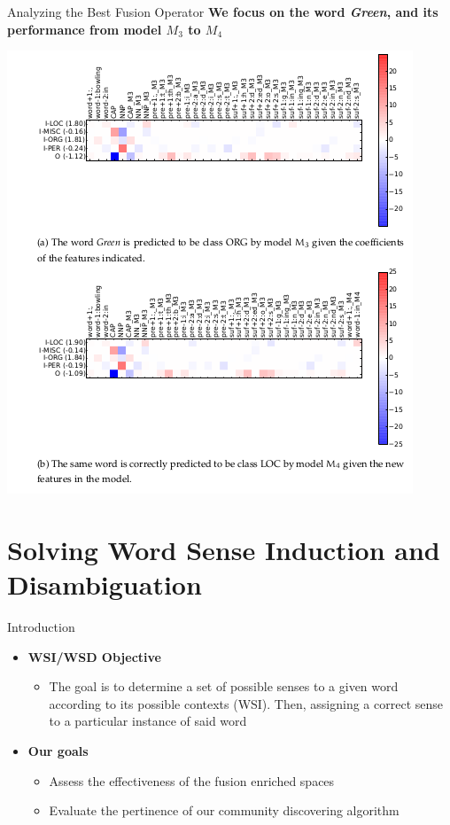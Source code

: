 \documentclass[10pt,=table]{beamer}
\begin{document}
\begin{frame}{Analyzing the Best Fusion Operator}
\large \textbf{We focus on the word \textit{Green}, and its performance from model $M_3$ to $M_4$}
\begin{center}
\includegraphics[width=0.6\linewidth]{image2/Chapitre4/fanalm3_m4.png}
\end{center}
\end{frame}

\section[Applications to NLP]{Solving Word Sense Induction and Disambiguation}

\begin{frame}{Introduction}
\begin{itemize}
\item<1-> \large \textbf{WSI/WSD Objective}
\begin{itemize}
\item<1->  The goal is to determine a set of possible senses to a given word according to its possible contexts (WSI). Then, assigning a correct sense to a particular instance of said word

\end{itemize}
\item<2-> \large \textbf{Our goals}
\begin{itemize}
\item<2-> Assess the effectiveness of the fusion enriched spaces
\item<2-> Evaluate the pertinence of our community discovering algorithm
\end{itemize}

\end{itemize}
\end{frame}
\end{document}

